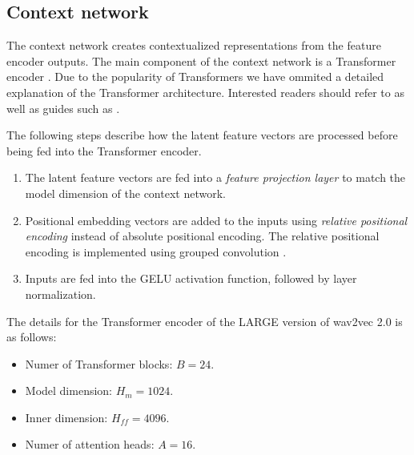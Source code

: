 \subsection{Context network}
The context network creates contextualized representations from the feature encoder outputs.
The main component of the context network is a Transformer encoder \cite{transformer}.
Due to the popularity of Transformers we have ommited a detailed explanation of the Transformer architecture. 
Interested readers should refer to \cite{transformer} as well as guides such as \cite{alammar2018illustrated}.

The following steps describe how the latent feature vectors are processed before being fed into the Transformer encoder.
\begin{enumerate}
    \item The latent feature vectors are fed into a \emph{feature projection layer} to match the model dimension of the context network.
    \item Positional embedding vectors are added to the inputs using \emph{relative positional encoding} \cite{shaw2018relative} instead of absolute positional encoding.
    The relative positional encoding is implemented using grouped convolution \cite{AlexNet}.
    \item Inputs are fed into the GELU activation function, followed by layer normalization.
\end{enumerate}


The details for the Transformer encoder of the \textsc{LARGE} version of wav2vec 2.0 is as follows:
\begin{itemize}
    \item Numer of Transformer blocks: $B = 24$.
    \item Model dimension: $H_m = 1024$.
    \item Inner dimension: $H_{ff} = 4096$.
    \item Numer of attention heads: $A = 16$.
\end{itemize}



